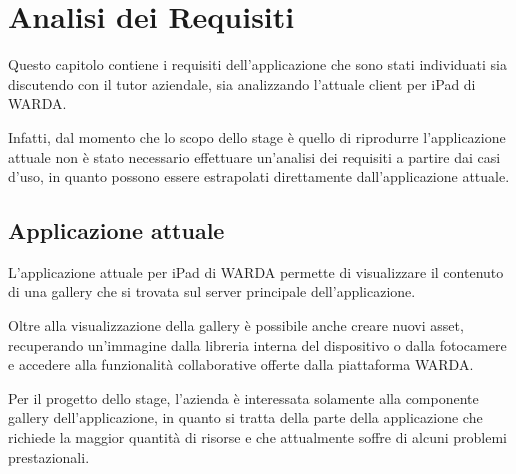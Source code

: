 
\chapter{Analisi dei Requisiti}
\label{cap:analisi-dei-requisiti}

Questo capitolo contiene i requisiti dell'applicazione che sono stati individuati sia discutendo con il tutor aziendale, sia analizzando l'attuale client per iPad di WARDA.

Infatti, dal momento che lo scopo dello stage è quello di riprodurre l'applicazione attuale non è stato necessario effettuare un'analisi dei requisiti a partire dai casi d'uso, in quanto possono essere estrapolati direttamente dall'applicazione attuale.





\section{Applicazione attuale}

L'applicazione attuale per iPad di WARDA permette di visualizzare il contenuto di una gallery che si trovata sul server principale dell'applicazione.

Oltre alla visualizzazione della gallery è possibile anche creare nuovi asset, recuperando un'immagine dalla libreria interna del dispositivo o dalla fotocamere e accedere alla funzionalità collaborative offerte dalla piattaforma WARDA.

Per il progetto dello stage, l'azienda è interessata solamente alla componente gallery dell'applicazione, in quanto si tratta della parte della applicazione che richiede la maggior quantità di risorse e che attualmente soffre di alcuni problemi prestazionali.

